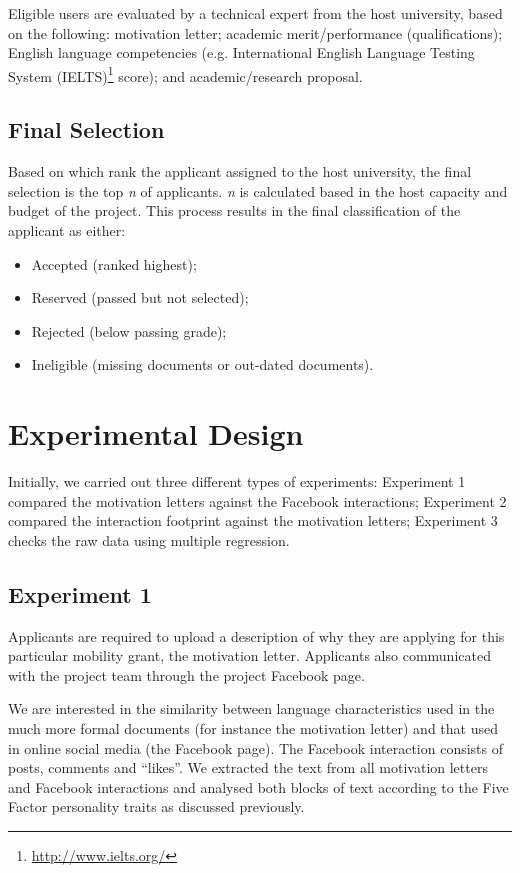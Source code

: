 \documentclass[letterpaper]{article}
\begin{document}
Eligible users are evaluated by a technical expert from the host
university, based on the following: motivation letter; academic
merit/performance (qualifications); English language competencies
(e.g. International English Language Testing System
(IELTS)\footnote{\url{http://www.ielts.org/}} score); and
academic/research proposal.

\subsection{Final Selection}

Based on which rank the applicant assigned to the host university, the
final selection is the top {\emph{n}} of applicants. {\emph{n}} is
calculated based in the host capacity and budget of the project. This
process results in the final classification of the applicant as
either:

\begin{itemize}
\item Accepted (ranked highest);
\item Reserved (passed but not selected);
\item Rejected (below passing grade); 
\item Ineligible (missing documents or out-dated documents).
\end{itemize}


\section{Experimental Design}

Initially, we carried out three different types of experiments:
Experiment 1 compared the motivation letters against the Facebook
interactions; Experiment 2 compared the interaction footprint against
the motivation letters; Experiment 3 checks the raw data using
multiple regression.

\subsection{Experiment 1}

Applicants are required to upload a description of why they are
applying for this particular mobility grant, the motivation
letter. Applicants also communicated with the project team through the
project Facebook page.

We are interested in the similarity between language characteristics
used in the much more formal documents (for instance the motivation
letter) and that used in online social media (the Facebook page). The
Facebook interaction consists of posts, comments and ``likes''. We
extracted the text from all motivation letters and Facebook
interactions and analysed both blocks of text according to the Five
Factor personality traits as discussed previously.
 
\end{document}
